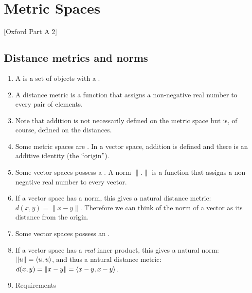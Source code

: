 \section{Metric Spaces}
[Oxford Part A 2]

\subsection{Distance metrics and norms}

\begin{enumerate}
\item A  is a set of objects with a .
\item A distance metric is a function that assigns a non-negative real number to every pair of
  elements.
\item Note that addition is not necessarily defined on the metric space but is, of course, defined
  on the distances.
\item Some metric spaces are . In a vector space, addition is defined and there
  is an additive identity (the ``origin'').
\item Some vector spaces possess a . A norm $\|.\|$ is a function that assigns a
  non-negative real number to every vector.
\item If a vector space has a norm, this gives a natural distance metric: $d(x, y) = \|x -
  y\|$. Therefore we can think of the norm of a vector as its distance from the origin.
\item Some vector spaces possess an .
\item If a vector space has a {\it real} inner product, this gives a natural norm:
  $\|u\| = \langle u, u\rangle$, and thus a natural distance metric:
  $d(x, y) = \|x - y\| = \langle x - y, x - y \rangle$.
\item Requirements


\end{enumerate}
